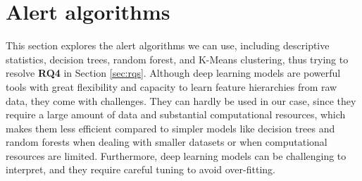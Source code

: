 


\section{Alert algorithms}
This section explores the alert algorithms we can use, including descriptive statistics, decision trees, random forest, and K-Means clustering, thus trying to resolve \textbf{RQ4} in Section \ref{sec:rqs}. Although deep learning models are powerful tools with great flexibility and capacity to learn feature hierarchies from raw data, they come with challenges. They can hardly be used in our case, since they require a large amount of data and substantial computational resources, which makes them less efficient compared to simpler models like decision trees and random forests when dealing with smaller datasets or when computational resources are limited. Furthermore, deep learning models can be challenging to interpret, and they require careful tuning to avoid over-fitting.


